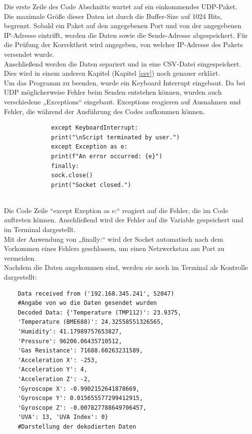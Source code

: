 Die erste Zeile des Code Abschnitts wartet auf ein einkommendes UDP-Paket. Die maximale Größe dieser Daten ist durch die Buffer-Size auf 1024 Bits, begrenzt. Sobald ein Paket auf den angegebenen Port und von der angegebenen IP-Adresse eintrifft, werden die Daten sowie die Sende-Adresse abgespeichert. Für die Prüfung der Korrektheit wird angegeben, von welcher IP-Adresse des Pakets versendet wurde. \\
\vspace{3mm}
Anschließend werden die Daten separiert und in eine CSV-Datei eingespeichert. Dies wird in einem anderen Kapitel (Kapitel \ref{csv}) noch genauer erklärt.\\
\vspace{3mm}
Um das Programm zu beenden, wurde ein Keyboard Interrupt eingebaut. Da bei UDP möglicherweise Fehler beim Senden entstehen können, wurden auch verschiedene „Exceptions“ eingebaut. Exceptions reagieren auf Ausnahmen und Fehler, die während der Ausführung des Codes aufkommen können. 
\vspace{3mm}
\begin{figure}[H]
	\centering
	\begin{verbatim}
		except KeyboardInterrupt:
		print("\nScript terminated by user.")
		except Exception as e:
		print(f"An error occurred: {e}")
		finally:
		sock.close()
		print("Socket closed.")
		
	\end{verbatim}
\end{figure}
Die Code Zeile “except Exeption as e:“ reagiert auf die Fehler, die im Code auftreten können. Anschließend wird der Fehler auf die Variable gespeichert und im Terminal dargestellt. \\
\vspace{3mm}
Mit der Anwendung von „finally:“ wird der Socket automatisch nach dem Vorkommen eines Fehlers geschlossen, um einen Netzwerkstau am Port zu vermeiden. \\
\vspace{3mm}
Nachdem die Daten angekommen sind, werden sie noch im Terminal als Kontrolle dargestellt:\\
\begin{verbatim}
	Data received from ('192.168.345.241', 52047)
	#Angabe von wo die Daten gesendet wurden
	Decoded Data: {'Temperature (TMP112)': 23.9375,
	'Temperature (BME688)': 24.32558551326565,
    'Humidity': 41.17989757653827, 
    'Pressure': 96206.06435710512, 
    'Gas Resistance': 71688.60263231589,
    'Acceleration X': -253, 
    'Acceleration Y': 4, 
    'Acceleration Z': -2, 
    'Gyroscope X': -0.9902152641878669, 
    'Gyroscope Y': 0.015655577299412915, 
    'Gyroscope Z': -0.007827788649706457, 
    'UVA': 13, 'UVA Index': 0} 
    #Darstellung der dekodierten Daten
\end{verbatim}
\vspace{3mm}

